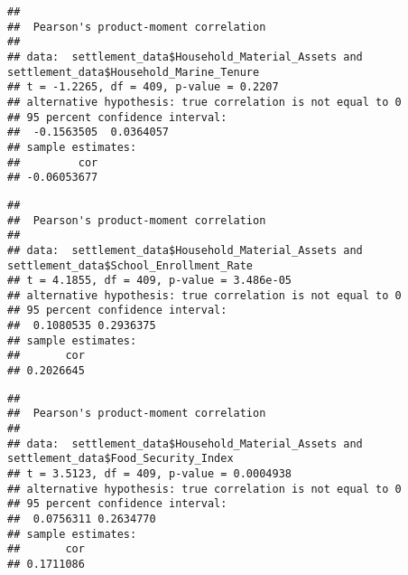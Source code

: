 \documentclass[
]{article}
\newenvironment{Shaded}{\begin{snugshade}}{\end{snugshade}}
\newcommand{\CommentTok}[1]{\textcolor[rgb]{0.56,0.35,0.01}{\textit{#1}}}
\newcommand{\FunctionTok}[1]{\textcolor[rgb]{0.13,0.29,0.53}{\textbf{#1}}}
\newcommand{\NormalTok}[1]{#1}
\newcommand{\SpecialCharTok}[1]{\textcolor[rgb]{0.81,0.36,0.00}{\textbf{#1}}}
\begin{document}
\begin{verbatim}
## 
##  Pearson's product-moment correlation
## 
## data:  settlement_data$Household_Material_Assets and settlement_data$Household_Marine_Tenure
## t = -1.2265, df = 409, p-value = 0.2207
## alternative hypothesis: true correlation is not equal to 0
## 95 percent confidence interval:
##  -0.1563505  0.0364057
## sample estimates:
##         cor 
## -0.06053677
\end{verbatim}

\begin{Shaded}
\end{Shaded}

\begin{verbatim}
## 
##  Pearson's product-moment correlation
## 
## data:  settlement_data$Household_Material_Assets and settlement_data$School_Enrollment_Rate
## t = 4.1855, df = 409, p-value = 3.486e-05
## alternative hypothesis: true correlation is not equal to 0
## 95 percent confidence interval:
##  0.1080535 0.2936375
## sample estimates:
##       cor 
## 0.2026645
\end{verbatim}

\begin{Shaded}
\end{Shaded}

\begin{verbatim}
## 
##  Pearson's product-moment correlation
## 
## data:  settlement_data$Household_Material_Assets and settlement_data$Food_Security_Index
## t = 3.5123, df = 409, p-value = 0.0004938
## alternative hypothesis: true correlation is not equal to 0
## 95 percent confidence interval:
##  0.0756311 0.2634770
## sample estimates:
##       cor 
## 0.1711086
\end{verbatim}
\end{document}
